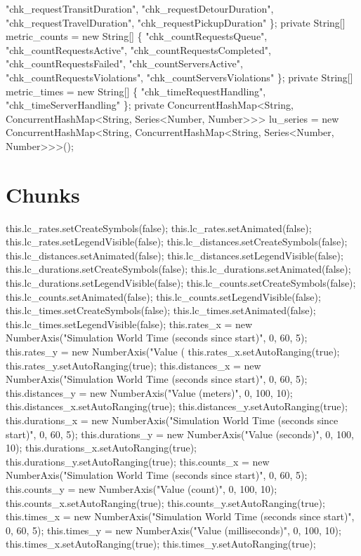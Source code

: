      "chk_requestTransitDuration",
      "chk_requestDetourDuration",
      "chk_requestTravelDuration",
      "chk_requestPickupDuration"
    \};
private String[] metric_counts = new String[] \{
      "chk_countRequestsQueue",
      "chk_countRequestsActive",
      "chk_countRequestsCompleted",
      "chk_countRequestsFailed",
      "chk_countServersActive",
      "chk_countRequestsViolations",
      "chk_countServersViolations"
    \};
private String[] metric_times = new String[] \{
      "chk_timeRequestHandling",
      "chk_timeServerHandling"
    \};
private ConcurrentHashMap<String, ConcurrentHashMap<String, Series<Number, Number>>> lu_series =
    new ConcurrentHashMap<String, ConcurrentHashMap<String, Series<Number, Number>>>();
\nwendcode{}\nwdocspar

\section{Chunks}
\nwenddocs{}\endmoddef{}
this.lc_rates.setCreateSymbols(false);
this.lc_rates.setAnimated(false);
this.lc_rates.setLegendVisible(false);
this.lc_distances.setCreateSymbols(false);
this.lc_distances.setAnimated(false);
this.lc_distances.setLegendVisible(false);
this.lc_durations.setCreateSymbols(false);
this.lc_durations.setAnimated(false);
this.lc_durations.setLegendVisible(false);
this.lc_counts.setCreateSymbols(false);
this.lc_counts.setAnimated(false);
this.lc_counts.setLegendVisible(false);
this.lc_times.setCreateSymbols(false);
this.lc_times.setAnimated(false);
this.lc_times.setLegendVisible(false);
this.rates_x = new NumberAxis("Simulation World Time (seconds since start)", 0, 60, 5);
this.rates_y = new NumberAxis("Value (%
this.rates_x.setAutoRanging(true);
this.rates_y.setAutoRanging(true);
this.distances_x = new NumberAxis("Simulation World Time (seconds since start)", 0, 60, 5);
this.distances_y = new NumberAxis("Value (meters)", 0, 100, 10);
this.distances_x.setAutoRanging(true);
this.distances_y.setAutoRanging(true);
this.durations_x = new NumberAxis("Simulation World Time (seconds since start)", 0, 60, 5);
this.durations_y = new NumberAxis("Value (seconds)", 0, 100, 10);
this.durations_x.setAutoRanging(true);
this.durations_y.setAutoRanging(true);
this.counts_x = new NumberAxis("Simulation World Time (seconds since start)", 0, 60, 5);
this.counts_y = new NumberAxis("Value (count)", 0, 100, 10);
this.counts_x.setAutoRanging(true);
this.counts_y.setAutoRanging(true);
this.times_x = new NumberAxis("Simulation World Time (seconds since start)", 0, 60, 5);
this.times_y = new NumberAxis("Value (milliseconds)", 0, 100, 10);
this.times_x.setAutoRanging(true);
this.times_y.setAutoRanging(true);
\nwendcode{}\nwdocspar

